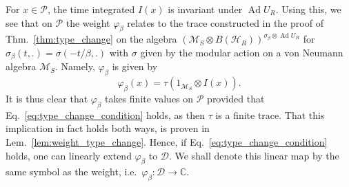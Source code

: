 \documentclass[sn-mathphys-num]{sn-jnl}%
\newcommand{\CC}{\mathbb{C}}
\newcommand{\HH}{\mathcal{H}}
\newcommand{\MM}{\mathcal{M}}
\DeclareMathOperator{\Ad}{Ad}
\numberwithin{equation}{section}
\theoremstyle{thmstyleone}%
\theoremstyle{thmstyletwo}%
\theoremstyle{thmstylethree}%
\begin{document}
For $x\in \mathcal{P}$, the time integrated $I(x)$ is invariant under $\Ad U_R$. Using this, we see that on $\mathcal{P}$ the weight $\varphi_\beta$ relates to the trace constructed in the proof of Thm.\ \ref{thm:type_change} on the algebra $(\MM_S\otimes B(\HH_R))^{\sigma_\beta\otimes \Ad U_R}$ for $\sigma_\beta(t,.)=\sigma(-t/\beta,.)$ with $\sigma$ given by the modular action on a von Neumann algebra $\MM_S$. Namely, $\varphi_\beta$ is given by
\begin{equation}
    \varphi_\beta(x)=\tau(1_{\MM_S}\otimes I(x)).
\end{equation}
It is thus clear that $\varphi_\beta$ takes finite values on $\mathcal{P}$ provided that Eq.\ \eqref{eq:type_change_condition} holds, as then $\tau$ is a finite trace. That this implication in fact holds both ways, is proven in Lem.\ \ref{lem:weight_type_change}. Hence, if Eq.\ \eqref{eq:type_change_condition} holds, one can linearly extend $\varphi_\beta$ to $\mathcal{D}$. We shall denote this linear map by the same symbol as the weight, i.e.\  $\varphi_\beta:\mathcal{D}\to\CC$.
\end{document}
